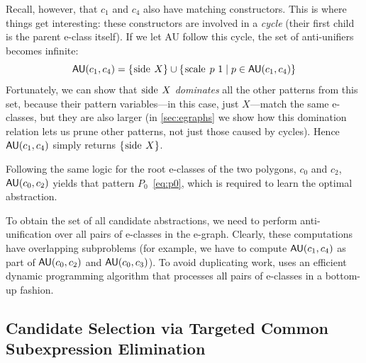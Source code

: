 Recall, however, that $c_1$ and $c_4$ also 
  have matching  constructors.
This is where things get interesting:
  these constructors are involved in a \emph{cycle} 
  (their first child is the parent e-class itself).
If we let AU follow this cycle, the set of anti-unifiers becomes infinite:
  $$
    \au(c_1, c_4) = \{\T{side}\ X\} \cup \{\T{scale}\ p\ 1 \mid p \in \au(c_1, c_4)\}
  $$
Fortunately,
  we can show that $\T{side}\ X$ \emph{dominates}
  all the other patterns from this set,
  because their pattern variables---in this case, just $X$---match
  the same e-classes, but they are also larger
  (in \autoref{sec:egraphs} we show how
  this domination relation lets us prune other patterns,
  not just those caused by cycles).
Hence $\mathsf{AU}(c_1, c_4)$ simply returns $\{\T{side}\ X\}$.

Following the same logic for the root e-classes of the two polygons, $c_0$ and $c_2$,
  $\mathsf{AU}(c_0, c_2)$ yields that pattern $P_0$~\eqref{eq:p0},
  which is required to learn the optimal abstraction.


%
To obtain the set of all candidate abstractions,
we need to perform anti-unification over all pairs of e-classes in the e-graph.
%
Clearly, these computations have overlapping subproblems
(for example, we have to compute $\mathsf{AU}(c_1, c_4)$ 
as part of $\mathsf{AU}(c_0, c_2)$ and  $\mathsf{AU}(c_0, c_3)$).
%
To avoid duplicating work, \tool uses an efficient dynamic programming algorithm
that processes all pairs of e-classes in a bottom-up fashion.

\subsection{Candidate Selection via Targeted Common Subexpression Elimination}

